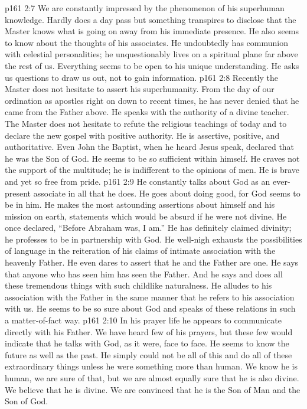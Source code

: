 \vs p161 2:7 \pc {}\bibnobreakspace We are constantly impressed by the phenomenon of his superhuman knowledge. Hardly does a day pass but something transpires to disclose that the Master knows what is going on away from his immediate presence. He also seems to know about the thoughts of his associates. He undoubtedly has communion with celestial personalities; he unquestionably lives on a spiritual plane far above the rest of us. Everything seems to be open to his unique understanding. He asks us questions to draw us out, not to gain information.
\vs p161 2:8 \pc {}\bibnobreakspace Recently the Master does not hesitate to assert his superhumanity. From the day of our ordination as apostles right on down to recent times, he has never denied that he came from the Father above. He speaks with the authority of a divine teacher. The Master does not hesitate to refute the religious teachings of today and to declare the new gospel with positive authority. He is assertive, positive, and authoritative. Even John the Baptist, when he heard Jesus speak, declared that he was the Son of God. He seems to be so sufficient within himself. He craves not the support of the multitude; he is indifferent to the opinions of men. He is brave and yet so free from pride.
\vs p161 2:9 \pc {}\bibnobreakspace He constantly talks about God as an ever\hyp{}present associate in all that he does. He goes about doing good, for God seems to be in him. He makes the most astounding assertions about himself and his mission on earth, statements which would be absurd if he were not divine. He once declared, \textcolor{ubdarkred}{“Before Abraham was, I am.”} He has definitely claimed divinity; he professes to be in partnership with God. He well\hyp{}nigh exhausts the possibilities of language in the reiteration of his claims of intimate association with the heavenly Father. He even dares to assert that he and the Father are one. He says that anyone who has seen him has seen the Father. And he says and does all these tremendous things with such childlike naturalness. He alludes to his association with the Father in the same manner that he refers to his association with us. He seems to be so sure about God and speaks of these relations in such a matter\hyp{}of\hyp{}fact way.
\vs p161 2:10 \pc {}\bibnobreakspace In his prayer life he appears to communicate directly with his Father. We have heard few of his prayers, but these few would indicate that he talks with God, as it were, face to face. He seems to know the future as well as the past. He simply could not be all of this and do all of these extraordinary things unless he were something more than human. We know he is human, we are sure of that, but we are almost equally sure that he is also divine. We believe that he is divine. We are convinced that he is the Son of Man and the Son of God.
